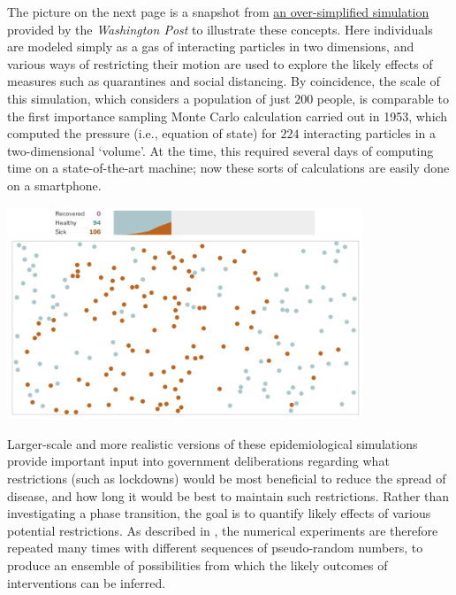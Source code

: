 The picture on the next page is a snapshot from \href{https://www.washingtonpost.com/graphics/2020/world/corona-simulator/}{an over-simplified simulation} provided by the \textit{Washington Post} to illustrate these concepts.
Here individuals are modeled simply as a gas of interacting particles in two dimensions, and various ways of restricting their motion are used to explore the likely effects of measures such as quarantines and social distancing.
By coincidence, the scale of this simulation, which considers a population of just $200$ people, is comparable to the first importance sampling Monte Carlo calculation carried out in 1953, which computed the pressure (i.e., equation of state) for $224$ interacting particles in a two-dimensional `volume'.
At the time, this required several days of computing time on a state-of-the-art machine; now these sorts of calculations are easily done on a smartphone.

\begin{center}\includegraphics[width=0.8\textwidth]{figs/unit10_epidemic.pdf}\end{center}

Larger-scale and more realistic versions of these epidemiological simulations provide important input into government deliberations regarding what restrictions (such as lockdowns) would be most beneficial to reduce the spread of disease, and how long it would be best to maintain such restrictions.
Rather than investigating a phase transition, the goal is to quantify likely effects of various potential restrictions.
As described in , the numerical experiments are therefore repeated many times with different sequences of pseudo-random numbers, to produce an ensemble of possibilities from which the likely outcomes of interventions can be inferred.

